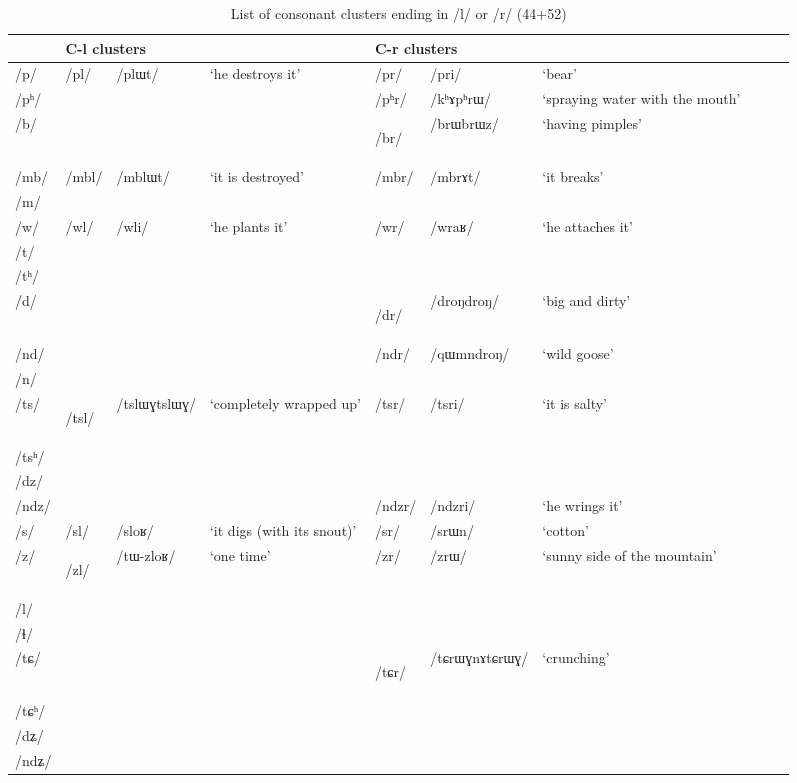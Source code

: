 \documentclass[12pt]{article}
\newcommand{\ipa}[1]{\mbox{\phon/#1/}}
\newcommand{\ipab}[1]{{\phon#1}}
\newcommand{\deux}[1]{\ipa{#1}\addtocounter{2clusters}{1}}
\newcommand{\tib}[1]{\cellcolor{lightgray}\textbf{#1}}
\newcommand{\idph}[1]{\cellcolor{gray}\textbf{#1}}
\begin{document}
  \begin{landscape}
 \begin{longtable}{llllllllll}
 \caption{List of consonant clusters ending in \ipa{l} or \ipa{r} (44+52)} \label{med.l.r} \\
\toprule
 & \multicolumn{3}{l}{C-\ipab{l} clusters} & \multicolumn{3}{l}{C-\ipab{r} clusters}   \\
\midrule
  \ipa{p} & \deux{pl} & \ipa{plɯt} & `he destroys it' & \deux{pr} & \ipa{pri} & `bear' \\ 
\ipa{pʰ} & & & & \deux{pʰr} & \ipa{kʰɤpʰrɯ} & `spraying water with the mouth' \\ 
\ipa{b} & & & & \deux{br} \idph{} & \ipa{brɯbrɯz} & `having pimples' \\ 
\ipa{mb} & \deux{mbl} & \ipa{mblɯt} & `it is destroyed' & \deux{mbr} & \ipa{mbrɤt} & `it breaks' \\ 
\ipa{m} & & & & & & \\ 
\ipa{w} & \deux{wl} & \ipa{wli} & `he plants it' & \deux{wr} & \ipa{wraʁ} & `he attaches it' \\ 
\ipa{t} & & & & & & \\ 
\ipa{tʰ} & & & & & & \\ 
\ipa{d} & & & & \deux{dr} \idph{} & \ipa{droŋdroŋ} & `big and dirty' \\ 
\ipa{nd} & & & & \deux{ndr} & \ipa{qɯmndroŋ} & `wild goose' \\ 
\ipa{n} & & & & & & \\ 
\ipa{ts} & \deux{tsl}\idph{} & \ipa{tslɯɣtslɯɣ} & `completely wrapped up' & \deux{tsr} & \ipa{tsri} & `it is salty' \\ 
\ipa{tsʰ} & & & & & & \\ 
\ipa{dz} & & & & & & \\ 
\ipa{ndz} & & & & \deux{ndzr} & \ipa{ndzri} & `he wrings it' \\ 
\ipa{s} & \deux{sl} & \ipa{sloʁ} & `it digs (with its snout)' & \deux{sr} & \ipa{srɯn} & `cotton' \\ 
\ipa{z} & \deux{zl} \tib{} & \ipa{tɯ-zloʁ} & `one time' & \deux{zr} & \ipa{zrɯ} & `sunny side of the mountain' \\ 
\ipa{l} & & & & & & \\ 
\ipa{ɬ} & & & & & & \\ 
\ipa{tɕ} & & & & \deux{tɕr} \idph{} & \ipa{tɕrɯɣnɤtɕrɯɣ} & `crunching' \\ 
\ipa{tɕʰ} & & & & & & \\ 
\ipa{dʑ} & & & & & & \\ 
\ipa{ndʑ} & & & & & & \\ 

\end{longtable}
\end{landscape}
\end{document}
